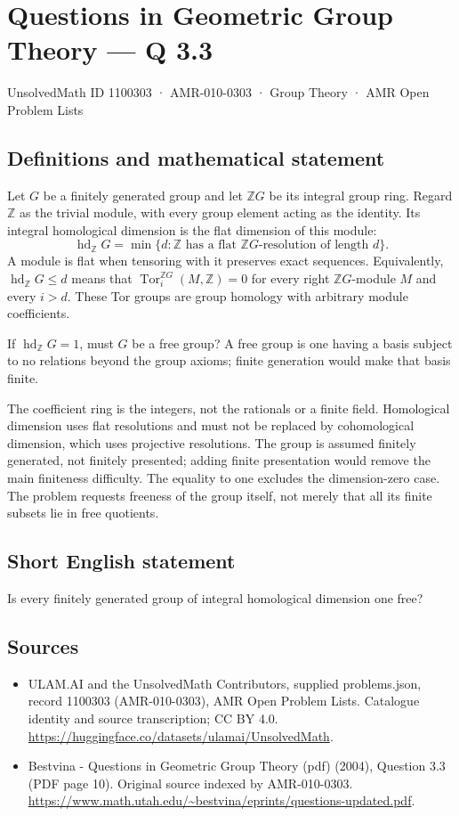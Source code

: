 \documentclass[11pt,a4paper]{article}
\begin{document}
\section*{Questions in Geometric Group Theory — Q 3.3}\label{1100303}
{\small UnsolvedMath ID 1100303 · AMR-010-0303 · Group Theory · AMR Open Problem Lists}
\subsection{Definitions and mathematical statement}
Let $G$ be a finitely generated group and let $\mathbb ZG$ be its integral group ring. Regard $\mathbb Z$ as the trivial module, with every group element acting as the identity. Its integral homological dimension is the flat dimension of this module:
\[
 \operatorname{hd}_{\mathbb Z}G
   =\min\{d:\mathbb Z\text{ has a flat }\mathbb ZG
                 \text{-resolution of length }d\}.
\]
A module is flat when tensoring with it preserves exact sequences. Equivalently, $\operatorname{hd}_{\mathbb Z}G\leq d$ means that $\operatorname{Tor}^{\mathbb ZG}_i(M,\mathbb Z)=0$ for every right $\mathbb ZG$-module $M$ and every $i>d$. These Tor groups are group homology with arbitrary module coefficients.

If $\operatorname{hd}_{\mathbb Z}G=1$, must $G$ be a free group? A free group is one having a basis subject to no relations beyond the group axioms; finite generation would make that basis finite.

The coefficient ring is the integers, not the rationals or a finite field. Homological dimension uses flat resolutions and must not be replaced by cohomological dimension, which uses projective resolutions. The group is assumed finitely generated, not finitely presented; adding finite presentation would remove the main finiteness difficulty. The equality to one excludes the dimension-zero case. The problem requests freeness of the group itself, not merely that all its finite subsets lie in free quotients.
\subsection{Short English statement}
Is every finitely generated group of integral homological dimension one free?
\subsection{Sources}
\begin{itemize}
\item[S1] ULAM.AI and the UnsolvedMath Contributors, supplied problems.json, record 1100303 (AMR-010-0303), AMR Open Problem Lists. Catalogue identity and source transcription; CC BY 4.0.
\url{https://huggingface.co/datasets/ulamai/UnsolvedMath}.
\item[S2] Bestvina - Questions in Geometric Group Theory (pdf) (2004), Question 3.3 (PDF page 10). Original source indexed by AMR-010-0303.
\url{https://www.math.utah.edu/~bestvina/eprints/questions-updated.pdf}.
\end{itemize}
\end{document}
